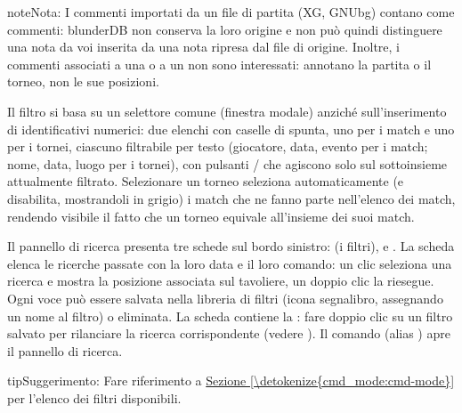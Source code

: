 \documentclass[letterpaper,10pt,italian]{sphinxmanual}
\begin{document}
\begin{sphinxadmonition}{note}{Nota:}
\sphinxAtStartPar
I commenti importati da un file di partita (XG, GNUbg) contano come commenti: blunderDB non conserva la loro origine e non può quindi distinguere una nota da voi inserita da una nota ripresa dal file di origine. Inoltre, i commenti associati a una  o a un  non sono interessati: annotano la partita o il torneo, non le sue posizioni.
\end{sphinxadmonition}

\sphinxAtStartPar
Il filtro  si basa su un selettore comune (finestra modale) anziché sull’inserimento di identificativi numerici: due elenchi con caselle di spunta, uno per i match e uno per i tornei, ciascuno filtrabile per testo (giocatore, data, evento per i match; nome, data, luogo per i tornei), con pulsanti  /  che agiscono solo sul sottoinsieme attualmente filtrato. Selezionare un torneo seleziona automaticamente (e disabilita, mostrandoli in grigio) i match che ne fanno parte nell’elenco dei match, rendendo visibile il fatto che un torneo equivale all’insieme dei suoi match.

\sphinxAtStartPar
Il pannello di ricerca presenta tre schede sul bordo sinistro:  (i filtri),  e . La scheda  elenca le ricerche passate con la loro data e il loro comando: un clic seleziona una ricerca e mostra la posizione associata sul tavoliere, un doppio clic la riesegue. Ogni voce può essere salvata nella libreria di filtri (icona segnalibro, assegnando un nome al filtro) o eliminata. La scheda  contiene la  : fare doppio clic su un filtro salvato per rilanciare la ricerca corrispondente (vedere {\hyperref[\detokenize{annexe_filtres:annexe-filtres}]{}}). Il comando  (alias ) apre il pannello di ricerca.

\begin{sphinxadmonition}{tip}{Suggerimento:}
\sphinxAtStartPar
Fare riferimento a \hyperref[\detokenize{cmd_mode:cmd-mode}]{Sezione \ref{\detokenize{cmd_mode:cmd-mode}}} per l’elenco dei filtri disponibili.
\end{sphinxadmonition}
\end{document}

